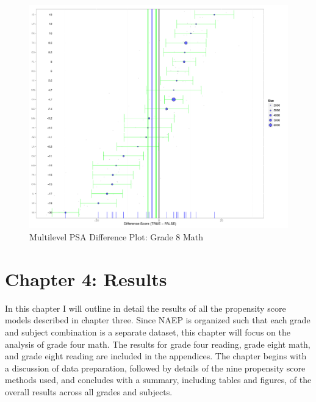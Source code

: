 \documentclass[letterpaper,12p,twoside]{article} %
\begin{document}
\begin{figure}[tp]
\begin{center}
\includegraphics[height=\textwidth]{../Figures2009/g8math-mlpsa-lr-diff.pdf}
\caption{Multilevel PSA Difference Plot: Grade 8 Math}
\label{fig:g8math:diff}
\end{center}
\end{figure}


\cleardoublepage
\section{Chapter 4: Results}

In this chapter I will outline in detail the results of all the propensity score models described in chapter three. Since NAEP is organized such that each grade and subject combination is a separate dataset, this chapter will focus on the analysis of grade four math. The results for grade four reading, grade eight math, and grade eight reading are included in the appendices. The chapter begins with a discussion of data preparation, followed by details of the nine propensity score methods used, and concludes with a summary, including tables and figures, of the overall results across all grades and subjects.
\end{document}
